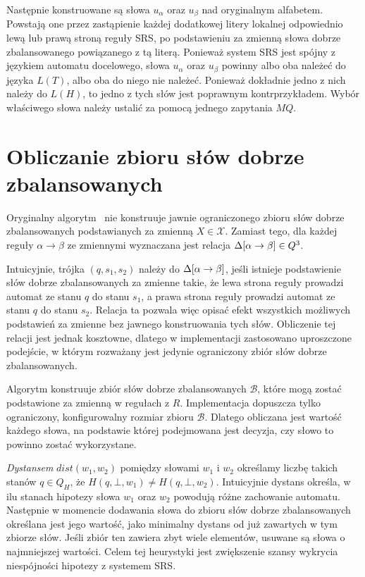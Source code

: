 Następnie konstruowane są słowa $u_{\alpha}$ oraz $u_{\beta}$ nad oryginalnym alfabetem. Powstają one przez zastąpienie
każdej dodatkowej litery lokalnej odpowiednio lewą lub prawą stroną reguły SRS, po podstawieniu za zmienną słowa
dobrze zbalansowanego powiązanego z tą literą.
Ponieważ system SRS jest spójny z językiem automatu docelowego, słowa $u_{\alpha}$ oraz $u_{\beta}$ powinny albo oba należeć do języka $L(T)$,
albo oba do niego nie należeć. Ponieważ dokładnie jedno z nich należy do $L(H)$, to jedno z tych słów jest
poprawnym kontrprzykładem. Wybór właściwego słowa należy ustalić za pomocą jednego zapytania $MQ$.

\section{Obliczanie zbioru słów dobrze zbalansowanych}

Oryginalny algorytm~\cite{SrsDvpa} nie konstruuje jawnie ograniczonego zbioru słów dobrze zbalansowanych podstawianych
za zmienną $X \in \mathcal{X}$. Zamiast tego, dla każdej reguły $\alpha \to \beta$ ze zmiennymi wyznaczana
jest relacja $\Delta[\alpha \to \beta] \in Q^3$.

Intuicyjnie, trójka $(q, s_1, s_2)$ należy do $\Delta[\alpha \to \beta]$, jeśli istnieje podstawienie słów dobrze zbalansowanych
za zmienne takie, że lewa strona reguły prowadzi automat ze stanu $q$ do stanu $s_1$, a prawa strona reguły prowadzi
automat ze stanu $q$ do stanu $s_2$. Relacja ta pozwala więc opisać efekt wszystkich możliwych podstawień za zmienne
bez jawnego konstruowania tych słów. Obliczenie tej relacji jest jednak kosztowne, dlatego w implementacji zastosowano
uproszczone podejście, w którym rozważany jest jedynie ograniczony zbiór słów dobrze zbalansowanych.

Algorytm konstruuje zbiór słów dobrze zbalansowanych $\mathcal{B}$, które mogą zostać podstawione za zmienną w regułach z $R$.
Implementacja dopuszcza tylko ograniczony, konfigurowalny rozmiar zbioru $\mathcal{B}$. Dlatego obliczana
jest wartość każdego słowa, na podstawie której podejmowana jest decyzja, czy słowo to powinno zostać wykorzystane.

\emph{Dystansem} $dist(w_1, w_2)$ pomiędzy słowami $w_1$ i $w_2$ określamy liczbę takich stanów
$q \in Q_H$, że $H(q, \bot, w_1) \neq H(q, \bot, w_2)$.
Intuicyjnie dystans określa, w ilu stanach hipotezy słowa $w_1$ oraz $w_2$ powodują różne zachowanie automatu.
Następnie w momencie dodawania słowa do zbioru słów dobrze zbalansowanych określana jest jego wartość,
jako minimalny dystans od już zawartych w tym zbiorze słów. Jeśli zbiór ten zawiera zbyt wiele elementów,
usuwane są słowa o najmniejszej wartości. Celem tej heurystyki jest zwiększenie szansy wykrycia niespójności
hipotezy z systemem SRS.

